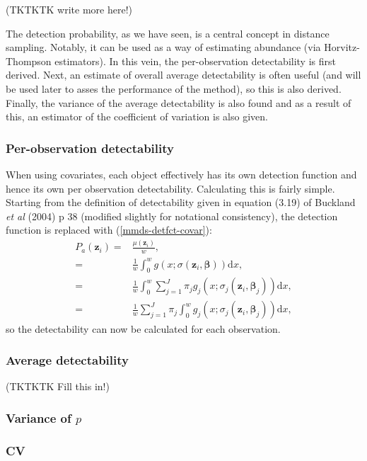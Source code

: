 (TKTKTK write more here!)

The detection probability, as we have seen, is a central concept in distance sampling. Notably, it can be used as a way of estimating abundance (via Horvitz-Thompson estimators). In this vein, the per-observation detectability is first derived. Next, an estimate of overall average detectability is often useful (and will be used later to asses the performance of the method), so this is also derived. Finally, the variance of the average detectability is also found and as a result of this, an estimator of the coefficient of variation is also given.

\subsubsection{Per-observation detectability}
When using covariates, each object effectively has its own detection function and hence its own per observation detectability. Calculating this is fairly simple. Starting from the definition of detectability given in equation (3.19) of Buckland \textit{et al} (2004) p 38 (modified slightly for notational consistency), the detection function is replaced with (\ref{mmds-detfct-covar}):
\begin{align*}
P_a(\bm{z}_i) =& \frac{\mu(\bm{z}_i)}{w},\\
=& \frac{1}{w} \int_0^w g(x; \sigma(\bm{z}_i,\bm{\beta})) \text{d}x,\\
=& \frac{1}{w} \int_0^w \sum_{j=1}^J \pi_j g_j(x; \sigma_j(\bm{z}_i, \bm{\beta}_j)) \text{d}x,\\
=& \frac{1}{w} \sum_{j=1}^J \pi_j \int_0^w  g_j(x; \sigma_j(\bm{z}_i, \bm{\beta}_j)) \text{d}x,
\end{align*}
so the detectability can now be calculated for each observation.


\subsubsection{Average detectability}
(TKTKTK  Fill this in!)

\subsubsection{Variance of $p$}

\subsubsection{CV}

